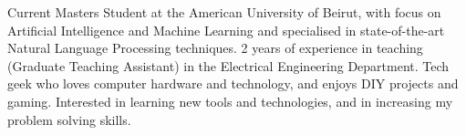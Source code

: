
\begin{cvparagraph}
Current Masters Student at the American University of Beirut, with focus on Artificial Intelligence and Machine Learning and specialised in state-of-the-art Natural Language Processing techniques. 2 years of experience in teaching (Graduate Teaching Assistant) in the Electrical Engineering Department. Tech geek who loves computer hardware and technology, and enjoys DIY projects and gaming. Interested in learning new tools and technologies, and in increasing my problem solving skills.
\end{cvparagraph}
